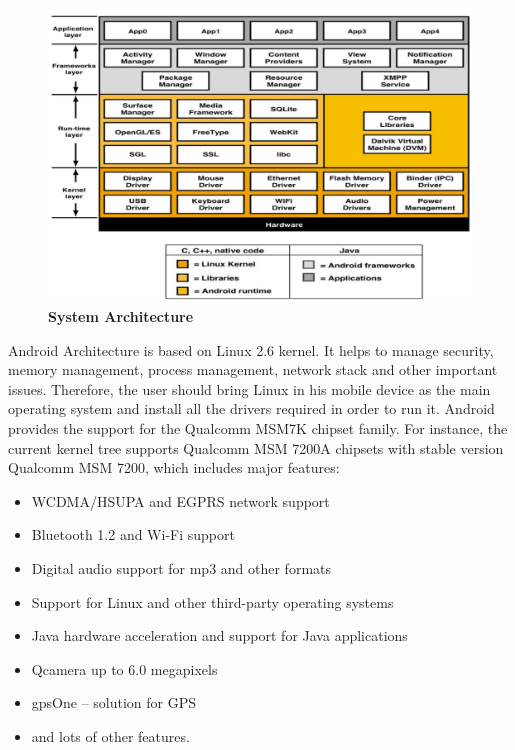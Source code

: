 \begin{figure}[H]
  \centering
    \includegraphics[scale=0.45]{project/images/system-architecture}
  \caption{\textbf{System Architecture}}
\end{figure}

Android Architecture is based on Linux 2.6 kernel. It helps to manage security,
memory management, process management, network stack and other important issues.
Therefore, the user should bring Linux in his mobile device as the main operating system and
install all the drivers required in order to run it. Android provides the support for the
Qualcomm MSM7K chipset family. For instance, the current kernel tree supports Qualcomm
MSM 7200A chipsets with stable version Qualcomm MSM 7200, which includes major
features:
\begin{itemize}
 \item WCDMA/HSUPA and EGPRS network support
 \item Bluetooth 1.2 and Wi-Fi support
 \item Digital audio support for mp3 and other formats
 \item Support for Linux and other third-party operating systems
 \item Java hardware acceleration and support for Java applications
 \item Qcamera up to 6.0 megapixels
 \item gpsOne – solution for GPS
 \item and lots of other features.
\end{itemize}

